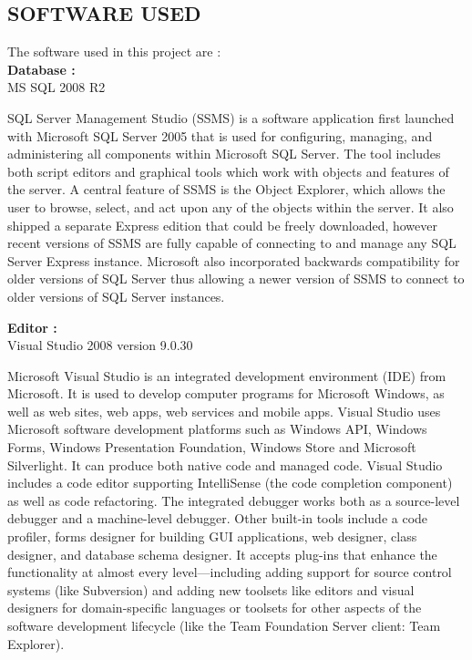 \documentclass[12pt]{article} %
\begin{document}
 \subsection{SOFTWARE USED}
 \noindent The software used in this project are :\\
\indent \textbf{Database :}\\
\indent MS SQL 2008 R2 \\ \par
  SQL Server Management Studio (SSMS) is a software application first launched with Microsoft SQL Server 2005 that is used for configuring, managing, and administering all components within Microsoft SQL Server. The tool includes both script editors and graphical tools which work with objects and features of the server.
A central feature of SSMS is the Object Explorer, which allows the user to browse, select, and act upon any of the objects within the server. It also shipped a separate Express edition that could be freely downloaded, however recent versions of SSMS are fully capable of connecting to and manage any SQL Server Express instance. Microsoft also incorporated backwards compatibility for older versions of SQL Server thus allowing a newer version of SSMS to connect to older versions of SQL Server instances.\\  \par
\textbf{Editor :}\\
\indent Visual Studio 2008 version 9.0.30\\ \par
Microsoft Visual Studio is an integrated development environment (IDE) from Microsoft. It is used to develop computer programs for Microsoft Windows, as well as web sites, web apps, web services and mobile apps. Visual Studio uses Microsoft software development platforms such as Windows API, Windows Forms, Windows Presentation Foundation, Windows Store and Microsoft Silverlight. It can produce both native code and managed code.
Visual Studio includes a code editor supporting IntelliSense (the code completion component) as well as code refactoring. The integrated debugger works both as a source-level debugger and a machine-level debugger. Other built-in tools include a code profiler, forms designer for building GUI applications, web designer, class designer, and database schema designer. It accepts plug-ins that enhance the functionality at almost every level—including adding support for source control systems (like Subversion) and adding new toolsets like editors and visual designers for domain-specific languages or toolsets for other aspects of the software development lifecycle (like the Team Foundation Server client: Team Explorer).\\  \par
\end{document}
